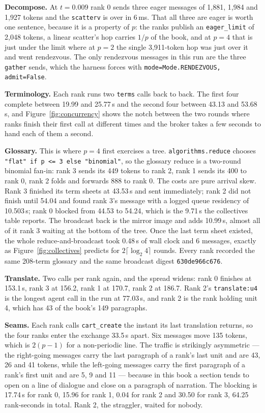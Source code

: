 \documentclass[11pt]{article}
\begin{document}
\textbf{Decompose.} At $t=0.009$ rank 0 sends three eager messages of 1{,}881, 1{,}984 and
1{,}927 tokens and the \texttt{scatterv} is over in 6\,ms. That all three are eager is worth
one sentence, because it is a property of $p$: the ranks publish an \texttt{eager\_limit} of
2{,}048 tokens, a linear scatter's hop carries $1/p$ of the book, and at $p=4$ that is just under
the limit where at $p=2$ the single 3{,}911-token hop was just over it and went rendezvous. The
only rendezvous messages in this run are the three \texttt{gather} sends, which the harness
forces with \texttt{mode=Mode.RENDEZVOUS, admit=False}.

\textbf{Terminology.} Each rank runs two \texttt{terms} calls back to back. The first four
complete between 19.99 and 25.77\,s and the second four between 43.13 and 53.68\,s, and
Figure~\ref{fig:concurrency} shows the notch between the two rounds where ranks finish their
first call at different times and the broker takes a few seconds to hand each of them a second.

\textbf{Glossary.} This is where $p=4$ first exercises a tree. \texttt{algorithms.reduce} chooses
\texttt{"flat" if p <= 3 else "binomial"}, so the glossary reduce is a two-round binomial fan-in:
rank 3 sends its 449 tokens to rank 2, rank 1 sends its 400 to rank 0, rank 2 folds and forwards
888 to rank 0. The costs are pure arrival skew. Rank 3 finished its term sheets at 43.53\,s and
sent immediately; rank 2 did not finish until 54.04 and found rank 3's message with a logged queue
residency of 10.503\,s; rank 0 blocked from 44.53 to 54.24, which is the 9.71\,s the collectives
table reports. The broadcast back is the mirror image and adds 10.99\,s, almost all of it rank 3
waiting at the bottom of the tree. Once the last term sheet existed, the whole
reduce-and-broadcast took 0.48\,s of wall clock and 6 messages, exactly as
Figure~\ref{fig:collectives} predicts for $2\lceil\log_2 4\rceil$ rounds. Every rank recorded the
same 208-term glossary and the same broadcast digest \texttt{630de966c676}.

\textbf{Translate.} Two calls per rank again, and the spread widens: rank 0 finishes at 153.1\,s,
rank 3 at 156.2, rank 1 at 170.7, rank 2 at 186.7. Rank 2's \texttt{translate:u4} is the longest
agent call in the run at 77.03\,s, and rank 2 is the rank holding unit 4, which has 43 of the
book's 149 paragraphs.

\textbf{Seams.} Each rank calls \texttt{cart\_create} the instant its last translation returns,
so the four ranks enter the exchange 33.5\,s apart. Six messages move 135 tokens, which is
$2(p-1)$ for a non-periodic line. The traffic is strikingly asymmetric --- the right-going
messages carry the last paragraph of a rank's last unit and are 43, 26 and 41 tokens, while the
left-going messages carry the first paragraph of a rank's first unit and are 5, 9 and 11 --- because
in this book a section tends to open on a line of dialogue and close on a paragraph of narration.
The blocking is 17.74\,s for rank 0, 15.96 for rank 1, 0.04 for rank 2 and 30.50 for rank 3,
64.25 rank-seconds in total. Rank 2, the straggler, waited for nobody.
\end{document}
